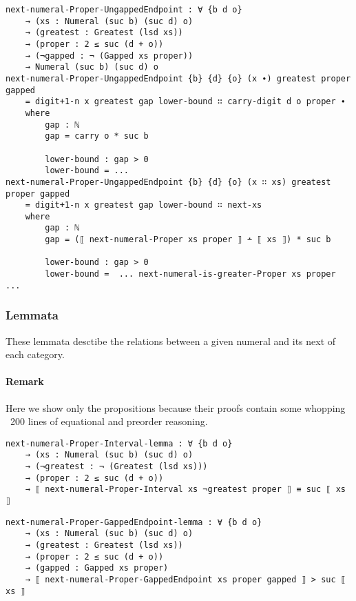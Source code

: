 \documentclass[\main/thesis.tex]{subfiles}
\begin{document}
\begin{lstlisting}[basicstyle=\ttfamily\scriptsize]
next-numeral-Proper-UngappedEndpoint : ∀ {b d o}
    → (xs : Numeral (suc b) (suc d) o)
    → (greatest : Greatest (lsd xs))
    → (proper : 2 ≤ suc (d + o))
    → (¬gapped : ¬ (Gapped xs proper))
    → Numeral (suc b) (suc d) o
next-numeral-Proper-UngappedEndpoint {b} {d} {o} (x ∙) greatest proper gapped
    = digit+1-n x greatest gap lower-bound ∷ carry-digit d o proper ∙
    where
        gap : ℕ
        gap = carry o * suc b

        lower-bound : gap > 0
        lower-bound = ...
next-numeral-Proper-UngappedEndpoint {b} {d} {o} (x ∷ xs) greatest proper gapped
    = digit+1-n x greatest gap lower-bound ∷ next-xs
    where
        gap : ℕ
        gap = (⟦ next-numeral-Proper xs proper ⟧ ∸ ⟦ xs ⟧) * suc b

        lower-bound : gap > 0
        lower-bound =  ... next-numeral-is-greater-Proper xs proper ...
\end{lstlisting}

\subsubsection{Lemmata}

These lemmata desctibe the relations between a given numeral and its next of
each category.

\paragraph{Remark} Here we show only the propositions because their proofs contain
some whopping ~200 lines of equational and preorder reasoning.

\begin{lstlisting}[basicstyle=\ttfamily\scriptsize]
next-numeral-Proper-Interval-lemma : ∀ {b d o}
    → (xs : Numeral (suc b) (suc d) o)
    → (¬greatest : ¬ (Greatest (lsd xs)))
    → (proper : 2 ≤ suc (d + o))
    → ⟦ next-numeral-Proper-Interval xs ¬greatest proper ⟧ ≡ suc ⟦ xs ⟧
\end{lstlisting}

\begin{lstlisting}[basicstyle=\ttfamily\scriptsize]
next-numeral-Proper-GappedEndpoint-lemma : ∀ {b d o}
    → (xs : Numeral (suc b) (suc d) o)
    → (greatest : Greatest (lsd xs))
    → (proper : 2 ≤ suc (d + o))
    → (gapped : Gapped xs proper)
    → ⟦ next-numeral-Proper-GappedEndpoint xs proper gapped ⟧ > suc ⟦ xs ⟧
\end{lstlisting}
\end{document}
